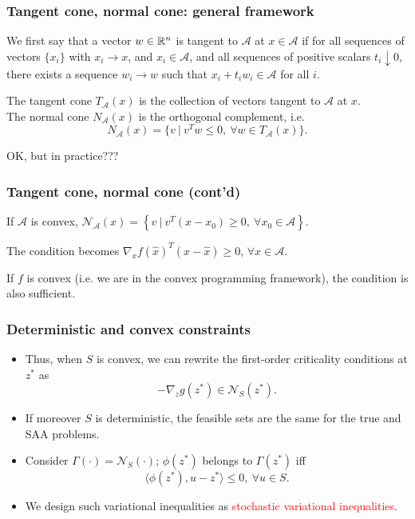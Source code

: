 \documentclass{beamer}
\begin{document}
\begin{frame}
\frametitle{Tangent cone, normal cone: general framework}

We first say that a vector $w \in \mathbb{R}^n$ is tangent to $\mathcal{A}$ at $x \in \mathcal{A}$ if for all sequences of vectors $\lbrace x_i \rbrace$ with $x_i \rightarrow x$, and $x_i \in \mathcal{A}$, and all sequences of positive scalars $t_i \downarrow 0$, there exists a sequence $w_i \rightarrow w$ such that $x_i + t_iw_i \in \mathcal{A}$ for all $i$.

\mbox{}

The {\red tangent cone $T_{\mathcal{A}}(x)$} is the collection of vectors tangent to ${\mathcal{A}}$ at $x$. \\
The {\red normal cone $N_{\mathcal{A}}(x)$} is the orthogonal complement, i.e.
\[
N_{\mathcal{A}}(x) = \lbrace v\ |\ v^Tw \leq 0,\ \forall w \in T_{\mathcal{A}}(x) \rbrace.
\]

\mbox{}

OK, but in practice???

\end{frame}

\begin{frame}
\frametitle{Tangent cone, normal cone (cont'd)}

If ${\mathcal{A}}$ is convex,
$
\mathcal{N}_{\mathcal{A}}(x) = \left\lbrace v\ |\ v^T(x-x_0) \geq 0,\ \forall x_0 \in
{\mathcal{A}} \right\rbrace.
$

\mbox{}

The condition becomes
$\nabla_x f(\hat{x})^T (x-\hat{x}) \geq 0$, $\forall x \in {\mathcal{A}}$.

\mbox{}

If $f$ is convex (i.e. we are in the convex programming framework), the condition is also sufficient.

\end{frame}

\begin{frame}
\frametitle{Deterministic and convex constraints}

\begin{itemize}
	\item 
Thus, when $S$ is convex, we can rewrite the first-order criticality conditions at $z^*$ as 
$$
-\nabla_z g(z^*) \in \mathcal{N}_{S}(z^*).
$$
\item 
If moreover $S$ is deterministic, the feasible sets are the same for the true and SAA problems.
\item
Consider %
$\Gamma(\cdot) = \mathcal{N}_S(\cdot)$; $\phi(z^*)$ belongs to $\Gamma(z^*)$ iff
\[
\langle \phi(z^*), u-z^*\rangle \leq 0,\ \forall u \in S.
\]
\item
We design such variational inequalities as \textcolor{red}{stochastic variational inequalities}.
\end{itemize}

\end{frame}
\end{document}
